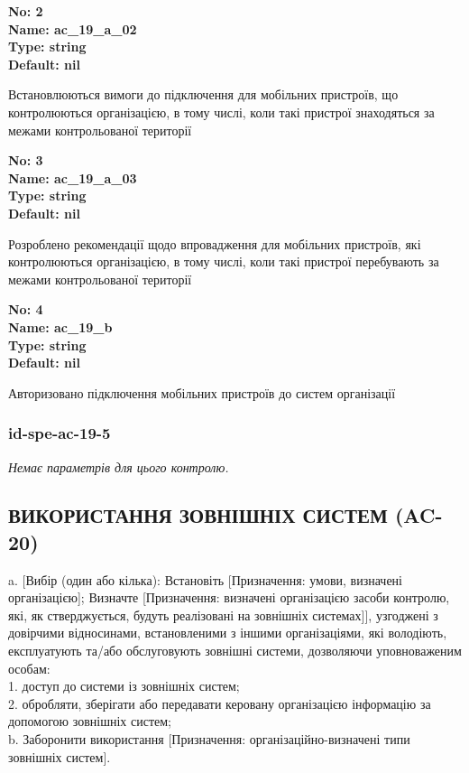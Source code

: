 \documentclass{article}
\begin{document}
{\footnotesize\bfseries
No: 2\\
Name: ac\_\allowbreak{}19\_\allowbreak{}a\_\allowbreak{}02\\
Type: string\\
Default: nil
}

{\footnotesize Встановлюються вимоги до підключення для мобільних пристроїв, що контролюються організацією, в тому числі, коли такі пристрої знаходяться за межами контрольованої території}


{\footnotesize\bfseries
No: 3\\
Name: ac\_\allowbreak{}19\_\allowbreak{}a\_\allowbreak{}03\\
Type: string\\
Default: nil
}

{\footnotesize Розроблено рекомендації щодо впровадження для мобільних пристроїв, які контролюються організацією, в тому числі, коли такі пристрої перебувають за межами контрольованої території}


{\footnotesize\bfseries
No: 4\\
Name: ac\_\allowbreak{}19\_\allowbreak{}b\\
Type: string\\
Default: nil
}

{\footnotesize Авторизовано підключення мобільних пристроїв до систем організації}




\subsubsection{id-spe-ac-19-5}


\vspace{10pt}
\textit{Немає параметрів для цього контролю.}
\vspace{10pt}


\subsection{ВИКОРИСТАННЯ ЗОВНІШНІХ СИСТЕМ (AC-20)}
a. [Вибір (один або кілька): Встановіть [Призначення: умови, визначені організацією]; Визначте [Призначення: визначені організацією засоби контролю, які, як стверджується, будуть реалізовані на зовнішніх системах]], узгоджені з довірчими відносинами, встановленими з іншими організаціями, які володіють, експлуатують та/або обслуговують зовнішні системи, дозволяючи уповноваженим особам:\\ 
1. доступ до системи із зовнішніх систем;\\ 
2. обробляти, зберігати або передавати керовану організацією інформацію за допомогою зовнішніх систем;\\ 
b. Заборонити використання [Призначення: організаційно-визначені типи зовнішніх систем].
\end{document}
